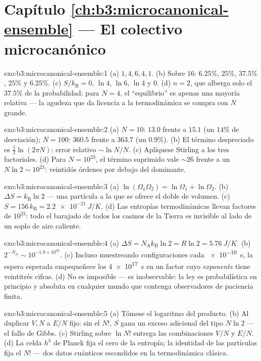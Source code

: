 \section*{Capítulo \ref{ch:b3:microcanonical-ensemble} --- El colectivo microcanónico}

\begin{solution}{exo:b3:microcanonical-ensemble:1}
(a) $1, 4, 6, 4, 1$. (b) Sobre $16$: $6.25\%$, $25\%$, $37.5\%$,
$25\%$ y $6.25\%$. (c) $S/k_{\text{B}} = 0$, $\ln4$, $\ln6$, $\ln4$ y
$0$. (d) $n = 2$, que alberga solo el $37.5\%$ de la probabilidad: para
$N = 4$, el ``equilibrio'' es apenas una mayoría relativa --- la agudeza
que da licencia a la termodinámica se compra con $N$ grande.
\end{solution}

\begin{solution}{exo:b3:microcanonical-ensemble:2}
(a) $N = 10$: $13.0$ frente a $15.1$ (un $14\%$ de desviación); $N = 100$:
$360.5$ frente a $363.7$ (un $0.9\%$). (b) El término despreciado es
$\tfrac12\ln(2\pi N)$: error relativo $\sim\ln N/N$. (c) Aplíquese
Stirling a los tres factoriales. (d) Para $N = 10^{23}$, el término
suprimido vale $\sim26$ frente a un $N\ln2 \sim 10^{23}$: veintidós órdenes
por debajo del dominante.
\end{solution}

\begin{solution}{exo:b3:microcanonical-ensemble:3}
(a) $\ln(\Omega_1\Omega_2) = \ln\Omega_1 + \ln\Omega_2$. (b)
$\Delta S = k_{\text{B}}\ln2$ --- una partícula a la que se ofrece el doble
de volumen. (c) $S = 156\,k_{\text{B}} = \qty{2.2e-21}{J/K}$. (d)
Las entropías termodinámicas llevan factores de $10^{23}$: todo el
barajado de todos los casinos de la Tierra es invisible al lado de un soplo
de aire caliente.
\end{solution}

\begin{solution}{exo:b3:microcanonical-ensemble:4}
(a) $\Delta S = N_{\text{A}}k_{\text{B}}\ln2 = R\ln2 =
\qty{5.76}{J/K}$. (b) $2^{-N_{\text{A}}} \sim 10^{-1.8\times
10^{23}}$. (c) Incluso muestreando configuraciones cada \qty{e-10}{s},
la espera esperada empequeñece los \qty{4e17}{s} en un factor cuyo
\emph{exponente} tiene veintitrés cifras. (d) No es imposible ---
es inobservable: la ley es probabilística en principio y absoluta
en cualquier mundo que contenga observadores de paciencia finita.
\end{solution}

\begin{solution}{exo:b3:microcanonical-ensemble:5}
(a) Tómese el logaritmo del producto. (b) Al duplicar $V, N$ a
$E/N$ fijo: sin el $N!$, $S$ gana un exceso adicional del tipo $N\ln2$
--- el fallo de Gibbs. (c) Stirling sobre $\ln N!$ entrega las
combinaciones $V/N$ y $E/N$. (d) La celda $h^3$ de Planck fija el
cero de la entropía; la identidad de las partículas fija el $N!$ --- dos
datos cuánticos escondidos en la termodinámica clásica.
\end{solution}

